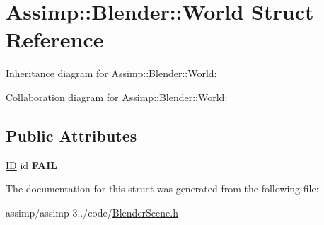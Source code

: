 \hypertarget{struct_assimp_1_1_blender_1_1_world}{\section{Assimp\+:\+:Blender\+:\+:World Struct Reference}
\label{struct_assimp_1_1_blender_1_1_world}
}


Inheritance diagram for Assimp\+:\+:Blender\+:\+:World\+:


Collaboration diagram for Assimp\+:\+:Blender\+:\+:World\+:
\subsection*{Public Attributes}
\begin{DoxyCompactItemize}
\item 
\hypertarget{struct_assimp_1_1_blender_1_1_world_a48857238d25ade3601c333b18f7057f1}{\hyperlink{struct_assimp_1_1_blender_1_1_i_d}{I\+D} id {\bfseries F\+A\+I\+L}}\label{struct_assimp_1_1_blender_1_1_world_a48857238d25ade3601c333b18f7057f1}

\end{DoxyCompactItemize}


The documentation for this struct was generated from the following file\+:\begin{DoxyCompactItemize}
\item 
assimp/assimp-\/3../code/\hyperlink{_blender_scene_8h}{Blender\+Scene.\+h}\end{DoxyCompactItemize}

